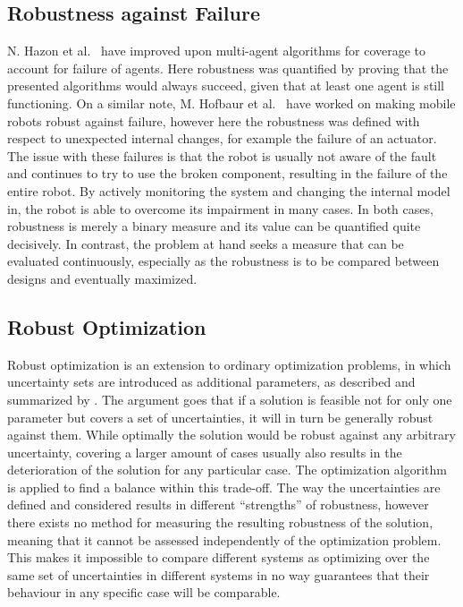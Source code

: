 \subsection{Robustness against Failure} \label{Robustness against Failure}
N. Hazon et al.\ \cite{covrob} have improved upon multi-agent algorithms for coverage  to account for failure of agents. Here robustness was quantified by proving that the presented algorithms would always succeed, given that at least one agent is still functioning. On a similar note, M. Hofbaur et al.\ \cite{sysrob} have worked on making mobile robots robust against failure, however here the robustness was defined with respect to unexpected internal changes, for example the failure of an actuator. The issue with these failures is that the robot is usually not aware of the fault and continues to try to use the broken component, resulting in the failure of the entire robot. By actively monitoring the system and changing the internal model in, the robot is able to overcome its impairment in many cases. In both cases, robustness is merely a binary measure and its value can be quantified quite decisively. In contrast, the problem at hand seeks a measure that can be evaluated continuously, especially as the robustness is to be compared between designs and eventually maximized. 
 

\subsection{Robust Optimization} \label{Robust Optimization}
Robust optimization is an extension to ordinary optimization problems, in which uncertainty sets are introduced as additional parameters, as described and summarized by \cite{optrob}. The argument goes that if a solution is feasible not for only one parameter but covers a set of uncertainties, it will in turn be generally robust against them. While optimally the solution would be robust against any arbitrary uncertainty, covering a larger amount of cases usually also results in the deterioration of the solution for any particular case. The optimization algorithm is applied to find a balance within this trade-off. The way the uncertainties are defined and considered results in different “strengths” of robustness, however there exists no method for measuring the resulting robustness of the solution, meaning that it cannot be assessed independently of the optimization problem. This makes it impossible to compare different systems as optimizing over the same set of uncertainties in different systems in no way guarantees that their behaviour in any specific case will be comparable.


